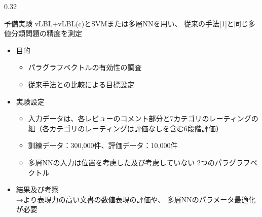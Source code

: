 \documentclass[8pt,unicode]{beamer}
\newcommand{\columnscale}{0.32}
\newcommand{\itemtitle}[1]{{\normalsize #1} \\}
\newcommand{\arrow}{{\color{ttiblue} →}\hspace{1ex}}
\begin{document}
\begin{frame}{}
\begin{columns}[t]
\begin{column}{\columnscale\textwidth} %
  \begin{block}{予備実験}
    vLBL+vLBL(c)とSVMまたは多層NNを用い、
    従来の手法[1]と同じ多値分類問題の精度を測定

    \begin{itemize}
      \item \itemtitle{目的}
      \begin{itemize}
        \item パラグラフベクトルの有効性の調査
        \item 従来手法との比較による目標設定
      \end{itemize}

      \item \itemtitle{実験設定}
      \begin{itemize}
        \item 入力データは、各レビューのコメント部分と7カテゴリのレーティングの
        組（各カテゴリのレーティングは評価なしを含む6段階評価）
        \item 訓練データ：300,000件、評価データ：10,000件
        \item 多層NNの入力は位置を考慮した及び考慮していない
        2つのパラグラフベクトル
      \end{itemize}

      \item \itemtitle{結果及び考察}
        \arrow より表現力の高い文書の数値表現の評価や、
        多層NNのパラメータ最適化が必要


    \end{itemize}


\end{block}
\end{column}
\end{columns}
\end{frame}
\end{document}
